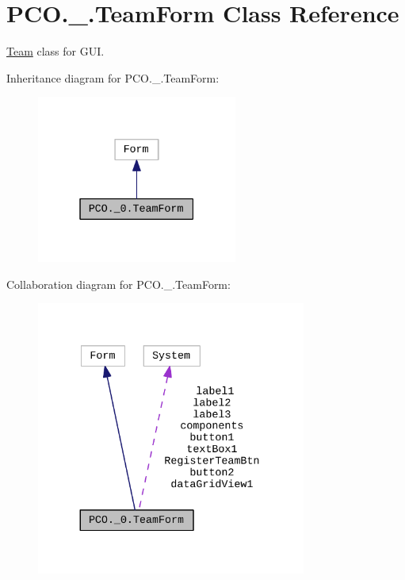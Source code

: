 \hypertarget{classPCO_1_1__0_1_1TeamForm}{}\section{P\+C\+O.\+\_.\+Team\+Form Class Reference}
\label{classPCO_1_1__0_1_1TeamForm}


\hyperlink{classTeam}{Team} class for G\+UI.  




Inheritance diagram for P\+C\+O.\+\_.\+Team\+Form\+:\nopagebreak
\begin{figure}[H]
\begin{center}
\leavevmode
\includegraphics[width=187pt]{classPCO_1_1__0_1_1TeamForm__inherit__graph}
\end{center}
\end{figure}


Collaboration diagram for P\+C\+O.\+\_.\+Team\+Form\+:\nopagebreak
\begin{figure}[H]
\begin{center}
\leavevmode
\includegraphics[width=251pt]{classPCO_1_1__0_1_1TeamForm__coll__graph}
\end{center}
\end{figure}
